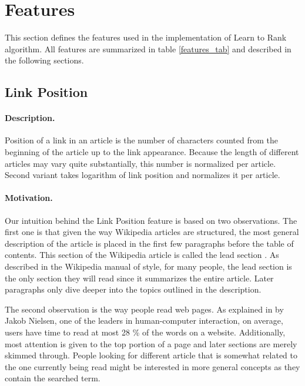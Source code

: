 \section{Features}
\label{sec:features}
This section defines the features used in the implementation of Learn to Rank algorithm. All features are summarized in table \ref{features_tab} and described in the following sections.

\subsection{Link Position}
\label{link position}
\paragraph{Description.}
Position of a link in an article is the number of characters counted from the beginning of the article up to the link appearance. Because the length of different articles may vary quite substantially, this number is normalized per article. Second variant takes logarithm of link position and normalizes it per article.

\paragraph{Motivation.}
Our intuition behind the Link Position feature is based on two observations. The first one is that given the way Wikipedia articles are structured, the most general description of the article is placed in the first few paragraphs before the table of contents. This section of the Wikipedia article is called the lead section \cite{lead}. As described in the Wikipedia manual of style, for many people, the lead section is the only section they will read since it summarizes the entire article. Later paragraphs only dive deeper into the topics outlined in the description. 

The second observation is the way people read web pages. As explained in \cite{nielsen} by Jakob Nielsen, one of the leaders in human-computer interaction, on average, users have time to read at most 28 \% of the words on a website. Additionally, most attention is given to the top portion of a page and later sections are merely skimmed through. People looking for different article that is somewhat related to the one currently being read might be interested in more general concepts as they contain the searched term. %

